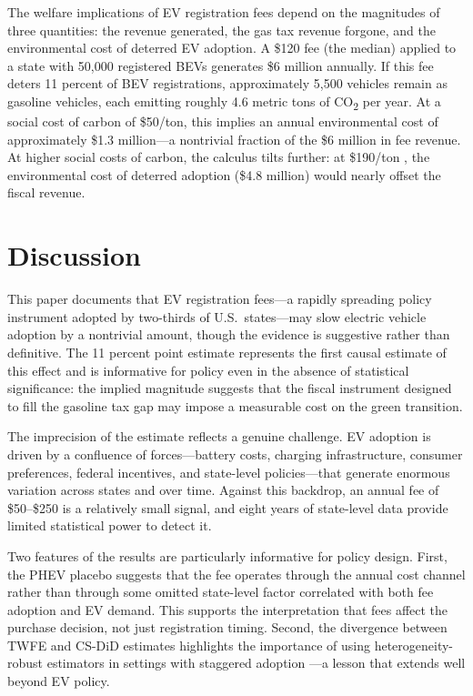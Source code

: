 \documentclass[12pt]{article}
\begin{document}
The welfare implications of EV registration fees depend on the magnitudes of three quantities: the revenue generated, the gas tax revenue forgone, and the environmental cost of deterred EV adoption. A \$120 fee (the median) applied to a state with 50,000 registered BEVs generates \$6 million annually. If this fee deters 11 percent of BEV registrations, approximately 5,500 vehicles remain as gasoline vehicles, each emitting roughly 4.6 metric tons of CO\textsubscript{2} per year. At a social cost of carbon of \$50/ton, this implies an annual environmental cost of approximately \$1.3 million---a nontrivial fraction of the \$6 million in fee revenue. At higher social costs of carbon, the calculus tilts further: at \$190/ton \citep{gillingham2018cost}, the environmental cost of deterred adoption (\$4.8 million) would nearly offset the fiscal revenue.

\section{Discussion}
\label{sec:discussion}

This paper documents that EV registration fees---a rapidly spreading policy instrument adopted by two-thirds of U.S.\ states---may slow electric vehicle adoption by a nontrivial amount, though the evidence is suggestive rather than definitive. The 11 percent point estimate represents the first causal estimate of this effect and is informative for policy even in the absence of statistical significance: the implied magnitude suggests that the fiscal instrument designed to fill the gasoline tax gap may impose a measurable cost on the green transition.

The imprecision of the estimate reflects a genuine challenge. EV adoption is driven by a confluence of forces---battery costs, charging infrastructure, consumer preferences, federal incentives, and state-level policies---that generate enormous variation across states and over time. Against this backdrop, an annual fee of \$50--\$250 is a relatively small signal, and eight years of state-level data provide limited statistical power to detect it.

Two features of the results are particularly informative for policy design. First, the PHEV placebo suggests that the fee operates through the annual cost channel rather than through some omitted state-level factor correlated with both fee adoption and EV demand. This supports the interpretation that fees affect the purchase decision, not just registration timing. Second, the divergence between TWFE and CS-DiD estimates highlights the importance of using heterogeneity-robust estimators in settings with staggered adoption \citep{roth2023whats}---a lesson that extends well beyond EV policy.
\end{document}
